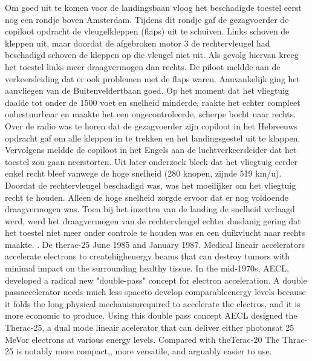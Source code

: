 Om goed uit te komen voor de landingsbaan vloog het beschadigde toestel eerst nog een rondje boven Amsterdam. Tijdens dit rondje gaf de gezagvoerder de copiloot opdracht de vleugelkleppen (flaps) uit te schuiven. Links schoven de kleppen uit, maar doordat de afgebroken motor 3 de rechtervleugel had beschadigd schoven de kleppen op die vleugel niet uit. Als gevolg hiervan kreeg het toestel links meer draagvermogen dan rechts. De piloot meldde aan de verkeersleiding dat er ook problemen met de flaps waren.
Aanvankelijk ging het aanvliegen van de Buitenveldertbaan goed. Op het moment dat het vliegtuig daalde tot onder de 1500 voet en snelheid minderde, raakte het echter compleet onbestuurbaar en maakte het een ongecontroleerde, scherpe bocht naar rechts. Over de radio was te horen dat de gezagvoerder zijn copiloot in het Hebreeuws opdracht gaf om alle kleppen in te trekken en het landingsgestel uit te klappen. Vervolgens meldde de copiloot in het Engels aan de luchtverkeersleider dat het toestel zou gaan neerstorten. Uit later onderzoek bleek dat het vliegtuig eerder enkel recht bleef vanwege de hoge snelheid (280 knopen, zijnde 519 km/u). Doordat de rechtervleugel beschadigd was, was het moeilijker om het vliegtuig recht te houden. Alleen de hoge snelheid zorgde ervoor dat er nog voldoende draagvermogen was. Toen bij het inzetten van de landing de snelheid verlaagd werd, werd het draagvermogen van de rechtervleugel echter dusdanig gering dat het toestel niet meer onder controle te houden was en een duikvlucht naar rechts maakte.
\cite{aviationsafety04101992airplaneCrashBijlmer}
 \cite{catsr25022009Boeing737AmsterdamCrash}
\cite{zuilen23022019Tijdlijnpoldercrash}
\cite{wikinews04032009techfoutailines1951}
\cite{luchtvaartnieuws21012020boeing737conclusies}
\cite{adformatie280220209communicatiegebreken}
\cite{spinnael25022009onderzoekpolderbaancrash}
\cite{crashTurkishAirlines}
\cite{flightradar24}
\cite{flightstatstracker}. 
\newline \indent De therac-25 June 1985 and January 1987. 
Medical lineair accelerators accelerate electrons to createhighenergy beams that can destroy tumors with minimal impact on the surrounding healthy tissue.
In the mid-1970s, AECL, developed a radical new "double-pass" concept for electron acceleration. A double passaccelerator needs much less spaceto develop comparableenergy levels because it folds the long  physical mechanismrequired to accelerate the electros, and it is more economic to produce.
Using this double pass concept AECL designed the  Therac-25, a dual mode lineair acelerator that can deliver either photonsat 25 MeVor electrons at various energy levels. Compared with theTerac-20 The Thrac-25 is notably more compact,, more versatile, and arguably easier to use. 
